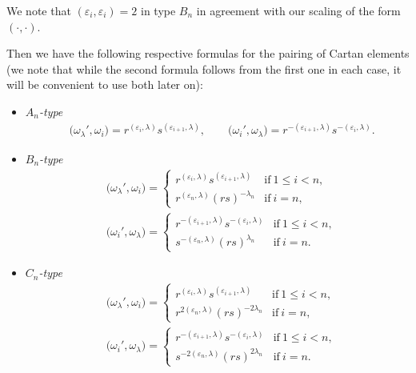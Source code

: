 \documentclass[pdftex]{sigma}
\numberwithin{equation}{section}
\begin{document}
\begin{Remark}
We note that $(\varepsilon_i,\varepsilon_i)=2$ in type $B_n$ in agreement with our scaling of the form~$(\cdot,\cdot)$.
\end{Remark}

Then we have the following respective formulas for the pairing of Cartan elements
(we note that while the second formula follows from the first one in each case, it will be convenient to use both later on):
\begin{itemize}\itemsep=0pt
\item
\emph{$A_{n}$-type}
\begin{align*}
 &\bigl(\omega_{\lambda}',\omega_{i}\bigr)= r^{( \varepsilon_{i},\lambda )}s^{( \varepsilon_{i +1},\lambda)}, \qquad
 \bigl(\omega_{i}',\omega_{\lambda}\bigr)= r^{-(\varepsilon_{i + 1},\lambda )}s^{-( \varepsilon_{i},\lambda)}.
\end{align*}

\item
\emph{$B_{n}$-type}
\begin{align}
 &\bigl(\omega_{\lambda}',\omega_{i}\bigr)=
 \begin{cases}
 r^{( \varepsilon_{i},\lambda )}s^{( \varepsilon_{i + 1},\lambda )}
 & \mathrm{if}\ 1\leq i<n ,\\
 r^{( \varepsilon_{n},\lambda ) }(rs)^{-\lambda_{n}}
 & \mathrm{if}\ i = n,
 \end{cases} \nonumber\\
 &\bigl(\omega_{i}',\omega_{\lambda}\bigr)=
 \begin{cases}
 r^{-( \varepsilon_{i + 1},\lambda)}s^{-( \varepsilon_{i},\lambda)}
 & \mathrm{if}\ 1\leq i<n ,\\
 s^{-( \varepsilon_{n},\lambda ) }(rs)^{\lambda_{n}}
 & \mathrm{if}\ i = n.
 \end{cases} \label{eq:B-pairing}
\end{align}

\item
\emph{$C_{n}$-type}
\begin{align}
 &\bigl(\omega_{\lambda}',\omega_{i}\bigr)=
 \begin{cases}
 r^{( \varepsilon_{i},\lambda) }s^{( \varepsilon_{i + 1},\lambda )}
 & \mathrm{if}\ 1\leq i<n ,\\
 r^{2( \varepsilon_{n},\lambda ) }(rs)^{-2\lambda_{n}}
 & \mathrm{if}\ i=n,
 \end{cases} \nonumber\\
 &\bigl(\omega_{i}',\omega_{\lambda}\bigr)=
 \begin{cases}
 r^{-( \varepsilon_{i + 1},\lambda )}s^{-( \varepsilon_{i},\lambda)}
 & \mathrm{if}\ 1\leq i<n, \\
 s^{-2( \varepsilon_{n},\lambda )}(rs)^{2\lambda_{n}}
 & \mathrm{if}\ i = n.
 \end{cases} \label{eq:C-pairing}
\end{align}


\end{itemize}
\end{document}
